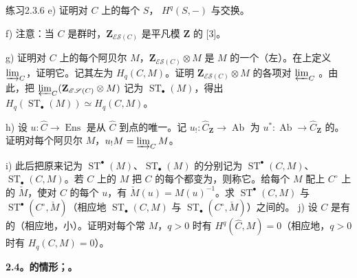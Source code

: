\begin{SGAresult}{练习}{2.3.6}
e) 证明对 $C$ 上的每个 $S$， $H^q(S,-)$ 与交换。

f) 注意：当 $C$ 是群时，$\mathbf Z_{\mathscr{ES}(C)}$ 是平凡模 $\mathbf Z$ 的 [3]。

g) 证明对 $C$ 上的每个阿贝尔 $M$，$\mathbf Z_{\mathscr{ES}(C)}\otimes M$ 是 $M$ 的一个（左）。在上定义 $\varinjlim_C$，证明它。记其左为 $H_q(C,M)$。证明 $\mathbf Z_{\mathscr{ES}(C)}\otimes M$ 的各项对 $\varprojlim_C$ 。由此，把 $\varprojlim_C(\mathbf Z_{\mathscr{ES}(C)}\otimes M)$ 记为 $\operatorname{ST}_\bullet(M)$，得出
$H_q(\operatorname{ST}_\bullet(M))\simeq H_q(C,M)$。

h) 设 $u:\widehat C\to\operatorname{Ens}$ 是从 $\widehat C$ 到点的唯一。记 $u_!:\widehat C_{\mathbf Z}\to\operatorname{Ab}$ 为 $u^*:\operatorname{Ab}\to\widehat C_{\mathbf Z}$ 的。证明对每个阿贝尔 $M$，$u_!M=\varinjlim_CM$。

i) 此后把原来记为 $\operatorname{ST}^\bullet(M)$、$\operatorname{ST}_\bullet(M)$ 的分别记为 $\operatorname{ST}^\bullet(C,M)$、$\operatorname{ST}_\bullet(C,M)$。若 $C$ 上的 $M$ 把 $C$ 的每个都变为，则称它。给每个 $M$ 配上 $C^\circ$ 上的 $\check M$，使对 $C$ 的每个 $u$，有 $\check M(u)=M(u)^{-1}$。求 $\operatorname{ST}^\bullet(C,M)$ 与 $\operatorname{ST}^\bullet(C^\circ,\check M)$（相应地 $\operatorname{ST}_\bullet(C,M)$ 与 $\operatorname{ST}_\bullet(C^\circ,\check M)$）之间的。
j) 设 $C$ 是有的（相应地，小）。证明对每个常 $M$，$q>0$ 时有 $H^q(\widehat C,M)=0$（相应地，$q>0$ 时有 $H_q(C,M)=0$）。
\end{SGAresult}

\textbf{2.4。的情形；。}

